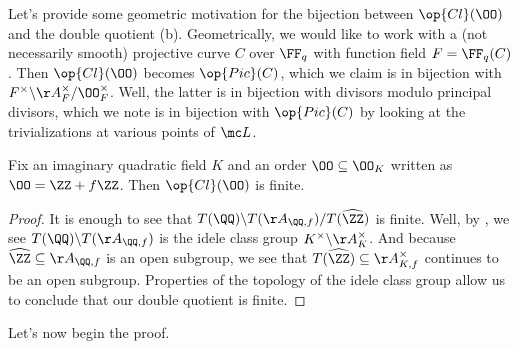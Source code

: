 \documentclass[../notes.tex]{subfiles}
\begin{document}
\begin{remark} \label{rem:class-group-as-double-quotient}
	Let's provide some geometric motivation for the bijection between $\op{Cl}(\OO)$ and the double quotient (b). Geometrically, we would like to work with a (not necessarily smooth) projective curve $C$ over $\FF_q$ with function field $F=\FF_q(C)$. Then $\op{Cl}(\OO)$ becomes $\op{Pic}(C)$, which we claim is in bijection with $F^\times\backslash\AA_F^\times/\OO_F^\times$. Well, the latter is in bijection with divisors modulo principal divisors, which we note is in bijection with $\op{Pic}(C)$ by looking at the trivializations at various points of $\mc L$.
\end{remark}
\begin{corollary} \label{cor:cl-o-finite}
	Fix an imaginary quadratic field $K$ and an order $\OO\subseteq\OO_K$ written as $\OO=\ZZ+f\ZZ$. Then $\op{Cl}(\OO)$ is finite.
\end{corollary}
\begin{proof}
	It is enough to see that $T(\QQ)\backslash T(\AA_{\QQ,f})/T(\widehat\ZZ)$ is finite. Well, by , we see $T(\QQ)\backslash T(\AA_{\QQ,f})$ is the idele class group $K^\times\backslash\AA_K^\times$. And because $\widehat\ZZ\subseteq\AA_{\QQ,f}$ is an open subgroup, we see that $T(\widehat\ZZ)\subseteq\AA_{K,f}^\times$ continues to be an open subgroup. Properties of the topology of the idele class group allow us to conclude that our double quotient is finite.
\end{proof}
Let's now begin the proof.
\end{document}
